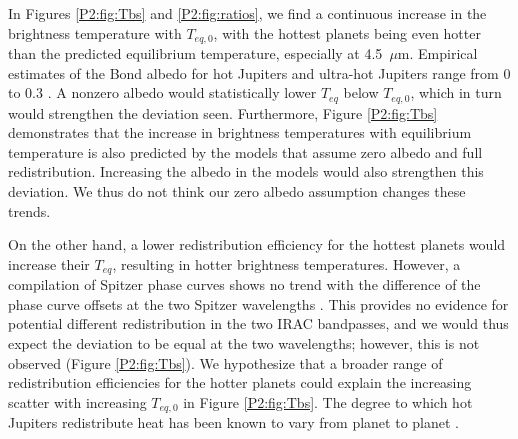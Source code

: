 In Figures \ref{P2:fig:Tbs} and \ref{P2:fig:ratios}, we find a continuous increase in the brightness temperature with $T_{eq,\textit{0}}$, with the hottest planets being even hotter than the predicted equilibrium temperature, especially at 4.5~$\mu$m. Empirical estimates of the Bond albedo for hot Jupiters and ultra-hot Jupiters range from 0 to 0.3 \citep{Schwartz2015, Schwartz2017}. A nonzero albedo would statistically lower $T_{eq}$ below $T_{eq,\textit{0}}$, which in turn would strengthen the deviation seen. Furthermore, Figure \ref{P2:fig:Tbs} demonstrates that the increase in brightness temperatures with equilibrium temperature is also predicted by the models that assume zero albedo and full redistribution. Increasing the albedo in the models would also strengthen this deviation. We thus do not think our zero albedo assumption  changes these trends.

On the other hand, a lower redistribution efficiency for the hottest planets would increase their $T_{eq}$, resulting in hotter brightness temperatures. However, a compilation of Spitzer phase curves shows no trend with the difference of the phase curve offsets at the two Spitzer wavelengths \citep{Beatty2019, Zhang2018}. This provides no evidence for potential different redistribution in the two IRAC bandpasses, and we would thus expect the deviation to be equal at the two wavelengths; however,  this is not observed (Figure \ref{P2:fig:Tbs}).
We hypothesize that a broader range of redistribution efficiencies for the hotter planets could explain the increasing scatter with increasing $T_{eq,\textit{0}}$ in Figure \ref{P2:fig:Tbs}. The degree to which hot Jupiters redistribute heat has been known to vary from planet to planet \citep{Showman2002, Cowan2007, Cowan2011b, Knutson2007, Showman2011}.

